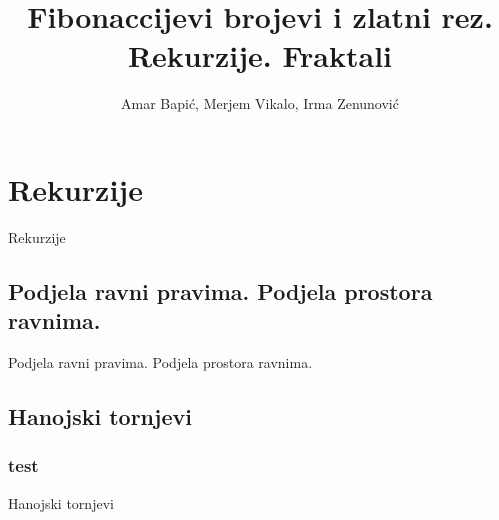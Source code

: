 \documentclass{beamer}
\title{Fibonaccijevi brojevi i zlatni rez. Rekurzije. Fraktali}
\author{Amar Bapić, Merjem Vikalo, Irma Zenunović}
\date{}
\institute{Univerzitet u Tuzli\\Prirodno - matematički fakultet\\ Odsjek Matematika}
\begin{document}
    \begin{frame}[plain]
        \titlepage
    \end{frame}
    \section{Rekurzije}
    \begin{frame}{Rekurzije}
    \end{frame}
    \subsection{Podjela ravni pravima. Podjela prostora ravnima.}
    \begin{frame}{Podjela ravni pravima. Podjela prostora ravnima.}

    \end{frame}
    \subsection{Hanojski tornjevi}
    \subsubsection{test}
    \begin{frame}{Hanojski tornjevi}

    \end{frame}

 
\end{document}
